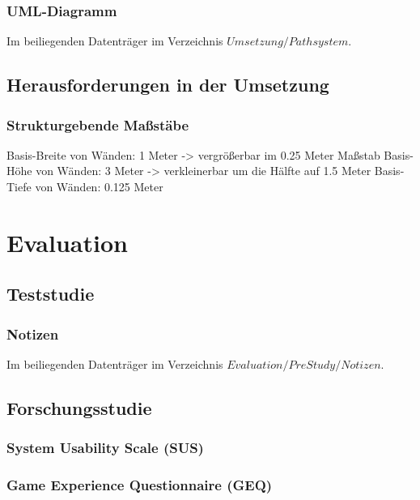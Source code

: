 \documentclass[
	12pt,
	a4paper,
	bibtotoc,
	cleardoubleempty, 
	idxtotoc,
	ngerman,
	openright
	final,
	listof=nochaptergap,
	]{scrbook}
\begin{document}
\begin{appendices}
\subsubsection{UML-Diagramm}\label{sec:append_realisation_uml_path}
Im beiliegenden Datenträger im Verzeichnis $Umsetzung/Pathsystem$. 

\subsection{Herausforderungen in der Umsetzung}

\subsubsection{Strukturgebende Maßstäbe}\label{sec:append_realisation_maßstaebe}
Basis-Breite von Wänden: 1 Meter -> vergrößerbar im 0.25 Meter Maßstab
Basis-Höhe von Wänden: 3 Meter -> verkleinerbar um die Hälfte auf 1.5 Meter
Basis-Tiefe von Wänden: 0.125 Meter

\section{Evaluation}

\subsection{Teststudie}

\subsubsection{Notizen}\label{sec:append_evaluation_pre_study_notes}
Im beiliegenden Datenträger im Verzeichnis $Evaluation/PreStudy/Notizen$.

\subsection{Forschungsstudie}


\subsubsection{System Usability Scale (SUS)}



\subsubsection{Game Experience Questionnaire (GEQ)}


\end{appendices}
\end{document}
